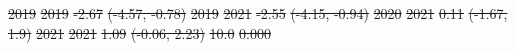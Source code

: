\documentclass[
  letterpaper,
  DIV=11,
  numbers=noendperiod]{scrartcl}
\providecommand{\DIFdeltex}[1]{{\protect\color{red}\sout{#1}}}                      %
\providecommand{\DIFdelFL}[1]{\DIFdel{#1}} %
\providecommand{\DIFdel}[1]{\texorpdfstring{\DIFdeltex{#1}}{}} %
\begin{document}
\DIFdelFL{\hspace{1em}2019 }%
\DIFdelFL{2019 }%
\DIFdelFL{-2.67 }%
\DIFdelFL{(-4.57, -0.78) }%
\DIFdelFL{\hspace{1em}2019 }%
\DIFdelFL{2021 }%
\DIFdelFL{-2.55 }%
\DIFdelFL{(-4.15, -0.94) }%
\DIFdelFL{\hspace{1em}2020 }%
\DIFdelFL{2021 }%
\DIFdelFL{0.11 }%
\DIFdelFL{(-1.67, 1.9) }%
\DIFdelFL{\hspace{1em}2021 }%
\DIFdelFL{2021 }%
\DIFdelFL{1.09 }%
\DIFdelFL{(-0.06, 2.23) }%
\DIFdelFL{10.0 }%
\DIFdelFL{0.000}%


\end{document}
